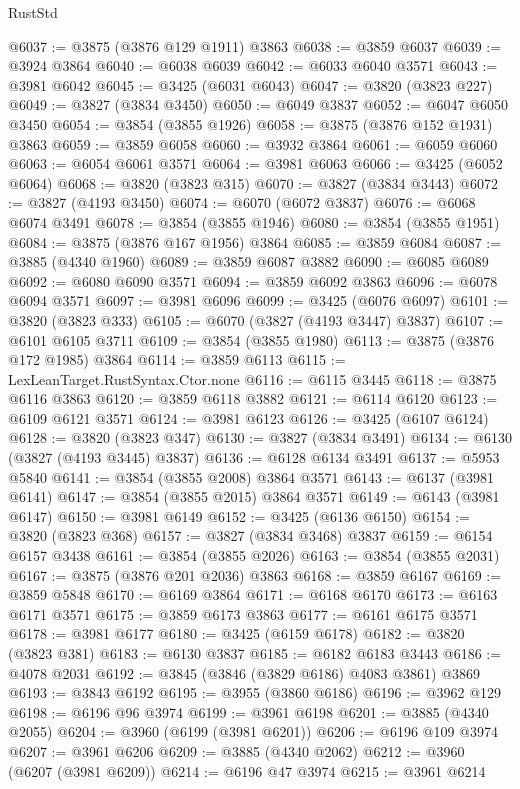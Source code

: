 \begin{lexlean}{RustStd}
\begin{coremodule}
@6037 := @3875 (@3876 @129 @1911) @3863
@6038 := @3859 @6037
@6039 := @3924 @3864
@6040 := @6038 @6039
@6042 := @6033 @6040 @3571
@6043 := @3981 @6042
@6045 := @3425 (@6031 @6043)
@6047 := @3820 (@3823 @227)
@6049 := @3827 (@3834 @3450)
@6050 := @6049 @3837
@6052 := @6047 @6050 @3450
@6054 := @3854 (@3855 @1926)
@6058 := @3875 (@3876 @152 @1931) @3863
@6059 := @3859 @6058
@6060 := @3932 @3864
@6061 := @6059 @6060
@6063 := @6054 @6061 @3571
@6064 := @3981 @6063
@6066 := @3425 (@6052 @6064)
@6068 := @3820 (@3823 @315)
@6070 := @3827 (@3834 @3443)
@6072 := @3827 (@4193 @3450)
@6074 := @6070 (@6072 @3837)
@6076 := @6068 @6074 @3491
@6078 := @3854 (@3855 @1946)
@6080 := @3854 (@3855 @1951)
@6084 := @3875 (@3876 @167 @1956) @3864
@6085 := @3859 @6084
@6087 := @3885 (@4340 @1960)
@6089 := @3859 @6087 @3882
@6090 := @6085 @6089
@6092 := @6080 @6090 @3571
@6094 := @3859 @6092 @3863
@6096 := @6078 @6094 @3571
@6097 := @3981 @6096
@6099 := @3425 (@6076 @6097)
@6101 := @3820 (@3823 @333)
@6105 := @6070 (@3827 (@4193 @3447) @3837)
@6107 := @6101 @6105 @3711
@6109 := @3854 (@3855 @1980)
@6113 := @3875 (@3876 @172 @1985) @3864
@6114 := @3859 @6113
@6115 := LexLeanTarget.RustSyntax.Ctor.none
@6116 := @6115 @3445
@6118 := @3875 @6116 @3863
@6120 := @3859 @6118 @3882
@6121 := @6114 @6120
@6123 := @6109 @6121 @3571
@6124 := @3981 @6123
@6126 := @3425 (@6107 @6124)
@6128 := @3820 (@3823 @347)
@6130 := @3827 (@3834 @3491)
@6134 := @6130 (@3827 (@4193 @3445) @3837)
@6136 := @6128 @6134 @3491
@6137 := @5953 @5840
@6141 := @3854 (@3855 @2008) @3864 @3571
@6143 := @6137 (@3981 @6141)
@6147 := @3854 (@3855 @2015) @3864 @3571
@6149 := @6143 (@3981 @6147)
@6150 := @3981 @6149
@6152 := @3425 (@6136 @6150)
@6154 := @3820 (@3823 @368)
@6157 := @3827 (@3834 @3468) @3837
@6159 := @6154 @6157 @3438
@6161 := @3854 (@3855 @2026)
@6163 := @3854 (@3855 @2031)
@6167 := @3875 (@3876 @201 @2036) @3863
@6168 := @3859 @6167
@6169 := @3859 @5848
@6170 := @6169 @3864
@6171 := @6168 @6170
@6173 := @6163 @6171 @3571
@6175 := @3859 @6173 @3863
@6177 := @6161 @6175 @3571
@6178 := @3981 @6177
@6180 := @3425 (@6159 @6178)
@6182 := @3820 (@3823 @381)
@6183 := @6130 @3837
@6185 := @6182 @6183 @3443
@6186 := @4078 @2031
@6192 := @3845 (@3846 (@3829 @6186) @4083 @3861) @3869
@6193 := @3843 @6192
@6195 := @3955 (@3860 @6186)
@6196 := @3962 @129
@6198 := @6196 @96 @3974
@6199 := @3961 @6198
@6201 := @3885 (@4340 @2055)
@6204 := @3960 (@6199 (@3981 @6201))
@6206 := @6196 @109 @3974
@6207 := @3961 @6206
@6209 := @3885 (@4340 @2062)
@6212 := @3960 (@6207 (@3981 @6209))
@6214 := @6196 @47 @3974
@6215 := @3961 @6214

\end{coremodule}
\end{lexlean}
